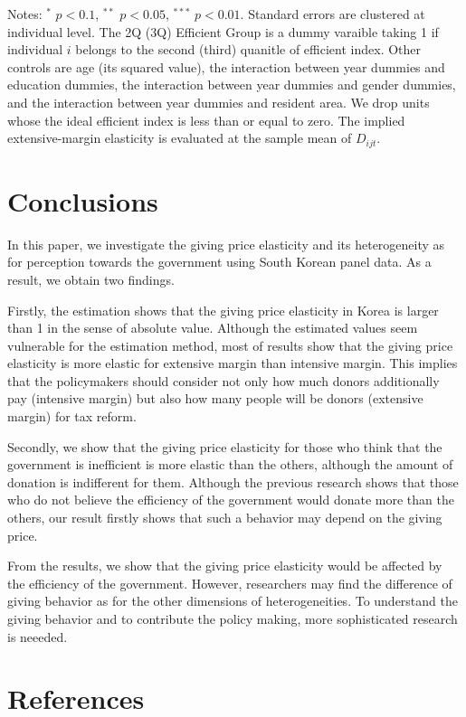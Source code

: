 \documentclass[
]{article}
\begin{document}
\begin{table}
\begin{threeparttable}
\begin{tablenotes}
\item Notes: $^{*}$ $p < 0.1$, $^{**}$ $p < 0.05$, $^{***}$ $p < 0.01$. Standard errors are clustered at individual level. The 2Q (3Q) Efficient Group is a dummy varaible taking 1 if individual $i$ belongs to the second (third) quanitle of efficient index. Other controls are age (its squared value), the interaction between year dummies and education dummies, the interaction between year dummies and gender dummies, and the interaction between year dummies and resident area. We drop units whose the ideal efficient index is less than or equal to zero. The implied extensive-margin elasticity is evaluated at the sample mean of $D_{ijt}$.
\end{tablenotes}
\end{threeparttable}
\end{table}

\hypertarget{conclusions}{%
\section{Conclusions}\label{conclusions}}

In this paper, we investigate the giving price elasticity and its heterogeneity as for perception towards the government using South Korean panel data. As a result, we obtain two findings.

Firstly, the estimation shows that the giving price elasticity in Korea is larger than 1 in the sense of absolute value. Although the estimated values seem vulnerable for the estimation method, most of results show that the giving price elasticity is more elastic for extensive margin than intensive margin. This implies that the policymakers should consider not only how much donors additionally pay (intensive margin) but also how many people will be donors (extensive margin) for tax reform.

Secondly, we show that the giving price elasticity for those who think that the government is inefficient is more elastic than the others, although the amount of donation is indifferent for them. Although the previous research shows that those who do not believe the efficiency of the government would donate more than the others, our result firstly shows that such a behavior may depend on the giving price.

From the results, we show that the giving price elasticity would be affected by the efficiency of the government. However, researchers may find the difference of giving behavior as for the other dimensions of heterogeneities. To understand the giving behavior and to contribute the policy making, more sophisticated research is neeeded.

\clearpage

\hypertarget{references}{%
\section*{References}\label{references}}
\end{document}
